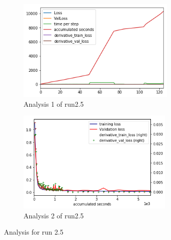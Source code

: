 \documentclass[paper=a4, fontsize=11pt]{scrartcl} %
\numberwithin{equation}{section} %
\numberwithin{figure}{section} %
\numberwithin{table}{section} %
\begin{document}
\begin{figure}	
	\begin{subfigure}{0.45\textwidth}
	\includegraphics[width=0.9\linewidth, height=5cm]{./imgs/analysis_0_2_5.png} 
	\caption{Analysis 1 of run2.5}
	\label{fig:subAnalysisRun25}
	\end{subfigure}
	\begin{subfigure}{0.45\textwidth}
	\includegraphics[width=0.9\linewidth, height=5cm]{./imgs/analysis_0_2_5plot.png}
	\caption{Analysis 2 of run2.5}
	\label{fig:subAnalysisRun25plot}
	\end{subfigure}
	 
	\caption{Analysis for run 2.5}
	\label{fig:AnalysisRun25}
 \end{figure}
 
\end{document}
